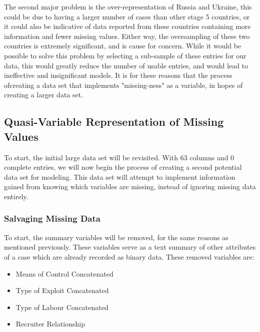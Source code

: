 \documentclass{article} %
\begin{document}
The second major problem is the over-representation of Russia and Ukraine, this could be due to having a larger number of cases than other stage 5 countries, or it could also be indicative of data reported from these countries containing more information and fewer missing values. Either way, the oversampling of these two countries is extremely significant, and is cause for concern. While it would be possible to solve this problem by selecting a sub-sample of these entries for our data, this would greatly reduce the number of usable entries, and would lead to ineffective and insignificant models. It is for these reasons that the process ofcreating a data set that implements "missing-ness" as a variable, in hopes of creating a larger data set. 

\subsection{Quasi-Variable Representation of Missing Values}

To start, the initial large data set will be revisited. With 63 columns and 0 complete entries, we will now begin the process of creating a second potential data set for modeling. This data set will attempt to implement information gained from knowing which variables are missing, instead of ignoring missing data entirely.

\subsubsection{Salvaging Missing Data}

To start, the summary variables will be removed, for the same reasons as mentioned previously. These variables serve as a text summary of other attributes of a case which are already recorded as binary data. These removed variables are:

\begin{multicols}{2}
	\begin{itemize}
		\item Means of Control Concatenated
		\item Type of Exploit Concatenated
		\item Type of Labour Concatenated
		\item Recruiter Relationship
	\end{itemize}
\end{multicols}
\end{document}
